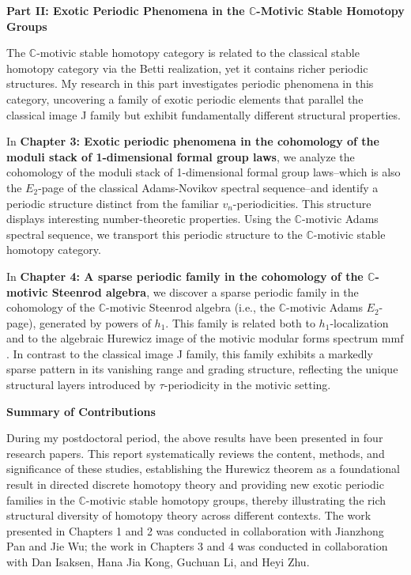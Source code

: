 \documentclass[12pt,a4paper]{report}
\theoremstyle{plain}
\theoremstyle{definition}
\newcommand{\mmf}{\mathrm{mmf}}
\newcommand{\C}{\mathbb{C}}
\begin{document}
\begin{center}
\textbf{Part II: Exotic Periodic Phenomena in the $\C$-Motivic Stable Homotopy Groups}
\end{center}

The $\C$-motivic stable homotopy category is related to the classical stable homotopy category via the Betti realization, yet it contains richer periodic structures. My research in this part investigates periodic phenomena in this category, uncovering a family of exotic periodic elements that parallel the classical image J family but exhibit fundamentally different structural properties.

In \textbf{Chapter 3: Exotic periodic phenomena in the cohomology of the moduli stack of 1-dimensional formal group laws}, we analyze the cohomology of the moduli stack of 1-dimensional formal group laws--which is also the $E_2$-page of the classical Adams-Novikov spectral sequence--and identify a periodic structure distinct from the familiar $v_n$-periodicities. This structure displays interesting number-theoretic properties. Using the $\C$-motivic Adams spectral sequence, we transport this periodic structure to the $\C$-motivic stable homotopy category.

In \textbf{Chapter 4: A sparse periodic family in the cohomology of the $\C$-motivic Steenrod algebra}, we discover a sparse periodic family in the cohomology of the 
$\C$-motivic Steenrod algebra (i.e., the $\C$-motivic Adams $E_2$-page), generated by powers of $h_1$. This family is related both to $h_1$-localization and to the algebraic Hurewicz image of the motivic modular forms spectrum $\mmf$. In contrast to the classical image J family, this family exhibits a markedly sparse pattern in its vanishing range and grading structure, reflecting the unique structural layers introduced by $\tau$-periodicity in the motivic setting.

\begin{center}
\textbf{Summary of Contributions}
\end{center}

During my postdoctoral period, the above results have been presented in four research papers. This report systematically reviews the content, methods, and significance of these studies, establishing the Hurewicz theorem as a foundational result in directed discrete homotopy theory and providing new exotic periodic families in the $\C$-motivic stable homotopy groups, thereby illustrating the rich structural diversity of homotopy theory across different contexts. The work presented in Chapters 1 and 2 was conducted in collaboration with Jianzhong Pan and Jie Wu; the work in Chapters 3 and 4 was conducted in collaboration with Dan Isaksen, Hana Jia Kong, Guchuan Li, and Heyi Zhu.
\vspace{1cm}
\end{document}
